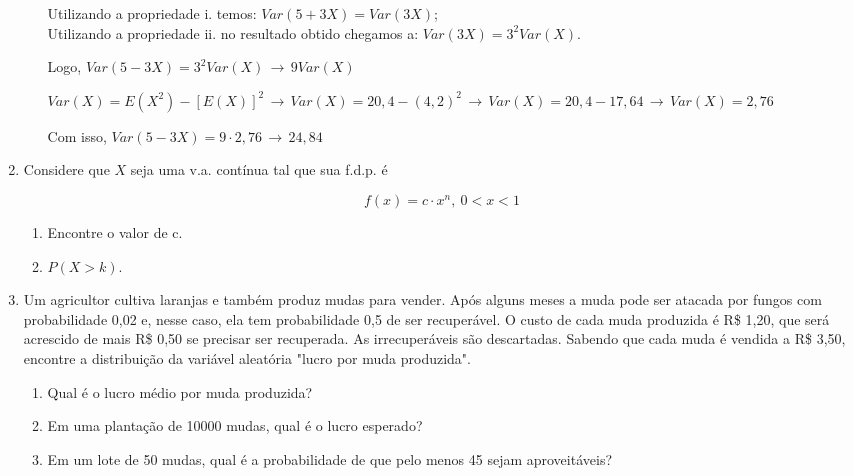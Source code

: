 \begin{enumerate}
\begin{enumerate}[label=\alph*.]
{			Utilizando a propriedade i. temos: $Var(5 + 3X) = Var(3X)$;\\Utilizando a propriedade ii. no resultado obtido chegamos a: $Var(3X) = 3^{2}Var(X)$.
			
			Logo, $Var(5-3X) = 3^{2}Var(X) \, \to\, 9Var(X)$
			
			$Var(X) = E(X^{2}) - [E(X)]^{2}\, \to\, Var(X) = 20,4 - (4,2)^{2} \, \to\, Var(X) = 20,4 - 17,64 \, \to\, Var(X) = 2,76$
			
			Com isso, $Var(5-3X) = 9\cdot2,76 \, \to\, 24,84$
		}
		
	\end{enumerate}
	
\item Considere que $X$ seja uma v.a. contínua tal que sua f.d.p. é

\[f(x)=c\cdot x^{n},\ 0<x<1\]

	\begin{enumerate}[label=\alph*)]
		\item Encontre o valor de c.
		
		
		\item $P(X > k)$.
		
		
	\end{enumerate}
	
\item Um agricultor cultiva laranjas e também produz mudas para vender. Após alguns meses a muda pode ser atacada por fungos com probabilidade 0,02 e, nesse caso, ela tem probabilidade 0,5 de ser recuperável. O custo de cada muda produzida é R\$ 1,20, que será acrescido de mais R\$ 0,50 se precisar ser recuperada. As irrecuperáveis são descartadas.
Sabendo que cada muda é vendida a R\$ 3,50, encontre a distribuição da variável aleatória "lucro por muda produzida".

	\begin{enumerate}[label=\alph*.]
		\item Qual é o lucro médio por muda produzida?
		\item Em uma plantação de 10000 mudas, qual é o lucro esperado?
		\item Em um lote de 50 mudas, qual é a probabilidade de que pelo menos 45 sejam aproveitáveis?
	\end{enumerate}


\end{enumerate}
